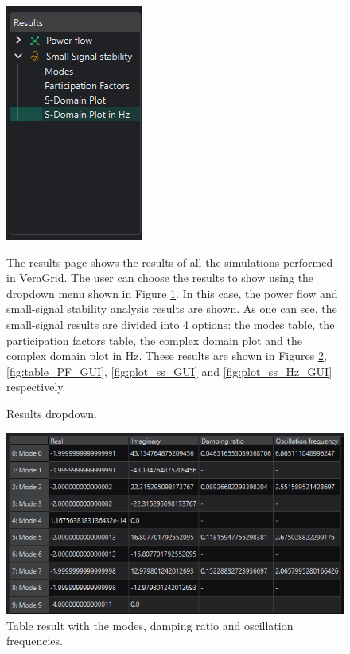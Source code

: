 \begin{figure}[H]
  \centering
  \begin{minipage}{0.35\textwidth}
    \centering
    \includegraphics[width=0.6\linewidth]{figures/results_desplegable_GUI.png}
    \caption{Results dropdown.}
    \label{fig:results_dropdown_GUI}
  \end{minipage}
  \hfill
  \begin{minipage}{0.6\textwidth}
    The results page shows the results of all the simulations performed in VeraGrid. The user can choose the results to show
    using the dropdown menu shown in Figure \ref{fig:results_dropdown_GUI}. In this case, the power flow and small-signal stability
     analysis results are shown. As one can see, the small-signal results are divided into 4 options: the modes table, the participation
     factors table, the complex domain plot and the complex domain plot in Hz. These results are shown in Figures \ref{fig:table_modes_GUI},
     \ref{fig:table_PF_GUI}, \ref{fig:plot_ss_GUI} and \ref{fig:plot_ss_Hz_GUI} respectively.
  \end{minipage}
\end{figure}

\begin{figure}[H]
  \centering
  \includegraphics[width=0.8\linewidth]{figures/result_modes_ss_GUI.png}
  \caption{Table result with the modes, damping ratio and oscillation frequencies.}
  \label{fig:table_modes_GUI}
\end{figure}

